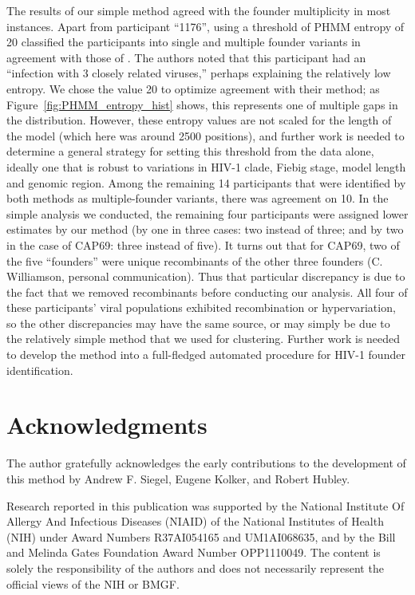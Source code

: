 \documentclass[preprint,12pt,authoryear]{elsarticle}
\begin{document}
The results of our simple method agreed with the founder multiplicity in most instances.  Apart from participant ``1176'', using a threshold of PHMM entropy of 20 classified the participants into single and multiple founder variants in agreement with those of \cite{Abrahams:2009aa}.  The authors noted that this participant had an ``infection with 3 closely related viruses,'' perhaps explaining the relatively low entropy.  We chose the value 20 to optimize agreement with their method; as Figure~\ref{fig:PHMM_entropy_hist} shows, this represents one of multiple gaps in the distribution.  However, these entropy values are not scaled for the length of the model (which here was around 2500 positions), and further work is needed to determine a general strategy for setting this threshold from the data alone, ideally one that is robust to variations in HIV-1 clade, Fiebig stage, model length and genomic region. Among the remaining 14 participants that were identified by both methods as multiple-founder variants, there was agreement on 10. In the simple analysis we conducted, the remaining four participants were assigned lower estimates by our method (by one in three cases: two instead of three; and by two in the case of CAP69: three instead of five).  It turns out that for CAP69, two of the five ``founders'' were unique recombinants of the other three founders  (C. Williamson, personal communication). Thus that particular discrepancy is due to the fact that we removed recombinants before conducting our analysis.  All four of these participants' viral populations exhibited recombination or hypervariation, so the other discrepancies may have the same source, or may simply be due to the relatively simple method that we used for clustering.  Further work is needed to develop the method into a full-fledged automated procedure for HIV-1 founder identification.

\section{Acknowledgments}
The author gratefully acknowledges the early contributions to the development of this method by Andrew F. Siegel, Eugene Kolker, and Robert Hubley.

Research reported in this publication was supported by the National Institute Of Allergy And Infectious Diseases (NIAID) of the National Institutes of Health (NIH) under Award Numbers R37AI054165 and UM1AI068635, and by the Bill and Melinda Gates Foundation Award Number OPP1110049. The content is solely the responsibility of the authors and does not necessarily represent the official views of the NIH or BMGF.
\end{document}
